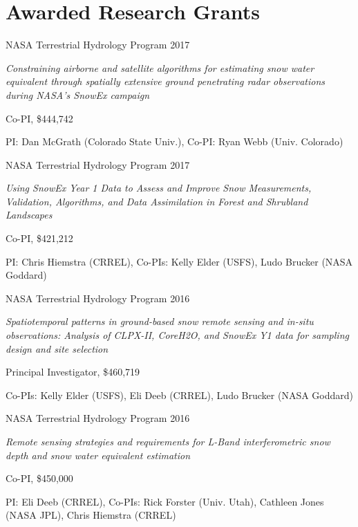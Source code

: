 \documentclass[11pt]{article}
\renewenvironment{itemize}{
  \begin{list}{}{
    \setlength{\leftmargin}{1.5em}
    \setlength{\itemsep}{0pt}
    \setlength{\parskip}{0pt}
  }
}{
  \end{list}
}
\begin{document}
\section*{Awarded Research Grants}
\begin{itemize} 

\item [6/2018-6/2021] NASA Terrestrial Hydrology Program 2017
\begin{itemize}
\item \textit{Constraining airborne and satellite algorithms for estimating snow water equivalent through spatially extensive ground penetrating radar observations during NASA's SnowEx campaign}
\item Co-PI, \$444,742
\item PI: Dan McGrath (Colorado State Univ.), Co-PI: Ryan Webb (Univ. Colorado)
\end{itemize}

\item [6/2018-6/2021] NASA Terrestrial Hydrology Program 2017
\begin{itemize}
\item \textit{Using SnowEx Year 1 Data to Assess and Improve Snow Measurements, Validation, Algorithms, and Data Assimilation in Forest and Shrubland Landscapes}
\item Co-PI, \$421,212
\item PI: Chris Hiemstra (CRREL), Co-PIs: Kelly Elder (USFS), Ludo Brucker (NASA Goddard)
\end{itemize}

\item [6/2017-6/2022] NASA Terrestrial Hydrology Program 2016
\begin{itemize}
\item \textit{Spatiotemporal patterns in ground-based snow remote sensing and in-situ observations: Analysis of CLPX-II, CoreH2O, and SnowEx Y1 data for sampling design and site selection}
\item Principal Investigator, \$460,719
\item Co-PIs: Kelly Elder (USFS), Eli Deeb (CRREL), Ludo Brucker (NASA Goddard)
\end{itemize}

\item [6/2017-6/2022] NASA Terrestrial Hydrology Program 2016
\begin{itemize}
\item \textit{Remote sensing strategies and requirements for L-Band interferometric snow depth and snow water equivalent estimation}
\item Co-PI, \$450,000
\item PI: Eli Deeb (CRREL), Co-PIs: Rick Forster (Univ. Utah), Cathleen Jones (NASA JPL), Chris Hiemstra (CRREL)
\end{itemize}


\end{itemize}
\end{document}
